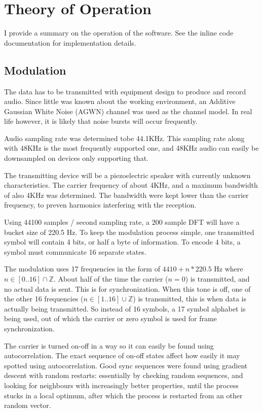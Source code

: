 \documentclass[a4paper]{article}
\begin{document}
\section{Theory of Operation}

I provide a summary on the operation of the software. See the inline
code documentation for implementation details.

\subsection{Modulation}

The data has to be transmitted with equipment design to produce and
record audio. Since little was known about the working environment,
an Additive Gaussian White Noise (AGWN) channel was used as the channel
model. In real life however, it is likely that noise bursts will occur
frequently.

Audio sampling rate was determined tobe 44.1KHz. This sampling rate
along with 48KHz is the most frequently supported one, and 48KHz audio
can easily be downsampled on devices only supporting that.

The transmitting device will be a piezoelectric speaker with currently
unknown characteristics. The carrier frequency of about 4KHz, and a
maximum bandwidth of also 4KHz was determined. The bandwidth were kept
lower than the carrier frequency, to preven harmonics interfering with
the reception.

Using 44100 samples / second sampling rate, a 200 sample DFT will have
a bucket size of 220.5 Hz. To keep the modulation process simple, one
transmitted symbol will contain 4 bits, or half a byte of information.
To encode 4 bits, a symbol must communicate 16 separate states.

The modulation uses 17 frequencies in the form of $4410 + n*220.5$ Hz
where $n \in [0..16] \cap \mathbb{Z}$. About half of the time the
carrier ($n=0$) is transmitted, and no actual data is sent. This is for
synchronization. When this tone is off, one of the other 16 frequencies
($n \in [1..16] \cup \mathbb{Z}$) is transmitted, this is when data is
actually being transmitted. So instead of 16 symbols, a 17 symbol
alphabet is being used, out of which the carrier or zero symbol is used
for frame synchronization.

The carrier is turned on-off in a way so it can easily be found using
autocorrelation. The exact sequence of on-off states affect how easily
it may spotted using autocorrelation. Good sync sequences were found
using gradient descent with random restarts: essentially by checking
random sequences, and looking for neighbours with increasingly better
properties, until the process stucks in a local optimum, after which
the process is restarted from an other random vector.
\end{document}

